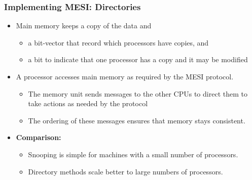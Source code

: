 \documentclass[../main.tex]{subfiles}
\begin{document}
\subsubsection{Implementing MESI: Directories}

\begin{itemize}
	\item Main memory keeps a copy of the data and
	      \begin{itemize}
		      \item a bit-vector that record which processors have copies, and
		      \item a bit to indicate that one processor has a copy and it may be modified
	      \end{itemize}
	\item A processor accesses main memory as required by the MESI protocol.
	      \begin{itemize}
		      \item The memory unit sends messages to the other CPUs to direct them to take actions as needed by the protocol
		      \item The ordering of these messages ensures that memory stays consistent.
	      \end{itemize}
	\item \textbf{Comparison:}
	      \begin{itemize}
		      \item Snooping is simple for machines with a small number of processors.
		      \item Directory methods scale better to large numbers of processors.
	      \end{itemize}
\end{itemize}
\end{document}
